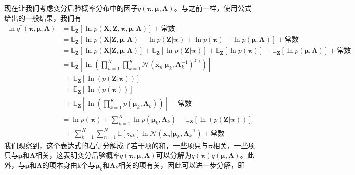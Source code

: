 现在让我们考虑变分后验概率分布中的因子$q(\boldsymbol{\pi},\boldsymbol{\mu},\boldsymbol{\Lambda})$。与之前一样，使用公式给出的一般结果，我们有
\begin{equation}
\label{xiaoxin}
	\begin{aligned}
		\ln q^*(\boldsymbol{\pi},\boldsymbol{\mu},\boldsymbol{\Lambda})&=\mathbb{E}_{\boldsymbol{Z}}[\ln p(\boldsymbol{X},\boldsymbol{Z},\boldsymbol{\pi},\boldsymbol{\mu},\boldsymbol{\Lambda})]+\text{常数}\\
		&=\mathbb{E}_{\boldsymbol{Z}}[\ln p(\boldsymbol{X}|\boldsymbol{Z},\boldsymbol{\mu},\boldsymbol{\Lambda})+\ln p(\boldsymbol{Z}|\boldsymbol{\pi})+\ln p(\boldsymbol{\pi})+\ln p(\boldsymbol{\mu},\boldsymbol{\Lambda})]+\text{常数}\\
		&=\mathbb{E}_{\boldsymbol{Z}}[\ln p(\boldsymbol{X}|\boldsymbol{Z},\boldsymbol{\mu},\boldsymbol{\Lambda})]+\mathbb{E}_{\boldsymbol{Z}}[\ln p(\boldsymbol{Z}|\boldsymbol{\pi})]+\mathbb{E}_{\boldsymbol{Z}}[\ln p(\boldsymbol{\pi})]+\mathbb{E}_{\boldsymbol{Z}}[\ln p(\boldsymbol{\mu},\boldsymbol{\Lambda})]+\text{常数}\\
		&=\mathbb{E}_{\boldsymbol{Z}}\left[\ln\left( \prod_{n=1}^{N}\prod_{k=1}^{K}\mathcal{N}(\boldsymbol{x}_n|\boldsymbol{\mu}_k,\boldsymbol{\Lambda}_k^{-1})^{z_{nk}}\right)\right]\\
		&\ \ +\mathbb{E}_{\boldsymbol{Z}}\left[\ln\left( p(\boldsymbol{Z}|\boldsymbol{\pi})\right)\right]\\
		&\ \ +\mathbb{E}_{\boldsymbol{Z}}\left[\ln\left( p(\boldsymbol{\pi})\right)\right]\\
		&\ \ +\mathbb{E}_{\boldsymbol{Z}}\left[\ln\left( \prod_{k=1}^{K}p(\boldsymbol{\mu}_k,\boldsymbol{\Lambda}_k)\right)\right]+\text{常数}\\	
		&=\ln p(\boldsymbol{\pi})+\sum_{k=1}^{K}\ln p(\boldsymbol{\mu}_k,\boldsymbol{\Lambda}_k)+\mathbb{E}_{\boldsymbol{Z}}\left[\ln\left( p(\boldsymbol{Z}|\boldsymbol{\pi})\right)\right]\\
		&\ \ +\sum_{k=1}^{K}\sum_{n=1}^{N}\mathbb{E}[z_{nk}]\ln \mathcal{N}(\boldsymbol{x}_n|\boldsymbol{\mu}_k,\boldsymbol{\Lambda}_k^{-1})+\text{常数}
	\end{aligned}
\end{equation}
我们观察到，这个表达式的右侧分解成了若干项的和，一些项只与$\boldsymbol{\pi}$相关，一些项只与$\boldsymbol{\mu}$和$\boldsymbol{\Lambda}$相关，这表明变分后验概率$q(\boldsymbol{\pi},\boldsymbol{\mu},\boldsymbol{\Lambda})$可以分解为$q(\boldsymbol{\pi})q(\boldsymbol{\mu},\boldsymbol{\Lambda})$。此外，与$\boldsymbol{\mu}$和$\boldsymbol{\Lambda}$的项本身由k个与$\boldsymbol{\mu}_k$和$\boldsymbol{\Lambda}_k$相关的项有关，因此可以进一步分解，即
